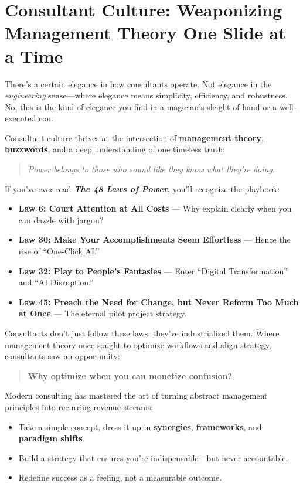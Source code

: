 \section{Consultant Culture: Weaponizing Management Theory One Slide at a Time}

There’s a certain elegance in how consultants operate.  Not elegance in the \textit{engineering} sense—where elegance means simplicity, efficiency, and robustness.  No, this is the kind of elegance you find in a magician’s sleight of hand or a well-executed con.

Consultant culture thrives at the intersection of \textbf{management theory}, \textbf{buzzwords}, and a deep understanding of one timeless truth:  
\begin{quote}
\textit{Power belongs to those who sound like they know what they’re doing.}
\end{quote}

If you’ve ever read \textbf{\textit{The 48 Laws of Power}}, you’ll recognize the playbook:

\begin{itemize}
  \item \textbf{Law 6: Court Attention at All Costs} — Why explain clearly when you can dazzle with jargon?
  \item \textbf{Law 30: Make Your Accomplishments Seem Effortless} — Hence the rise of ``One-Click AI.''
  \item \textbf{Law 32: Play to People's Fantasies} — Enter ``Digital Transformation'' and ``AI Disruption.''
  \item \textbf{Law 45: Preach the Need for Change, but Never Reform Too Much at Once} — The eternal pilot project strategy.
\end{itemize}

Consultants don’t just follow these laws: they’ve industrialized them.  Where management theory once sought to optimize workflows and align strategy, consultants saw an opportunity:  

\begin{quote}
\textbf{Why optimize when you can monetize confusion?}
\end{quote}

Modern consulting has mastered the art of turning abstract management principles into recurring revenue streams:

\begin{itemize}
  \item Take a simple concept, dress it up in \textbf{synergies}, \textbf{frameworks}, and \textbf{paradigm shifts}.
  \item Build a strategy that ensures you're indispensable—but never accountable.
  \item Redefine success as a feeling, not a measurable outcome.
\end{itemize}

